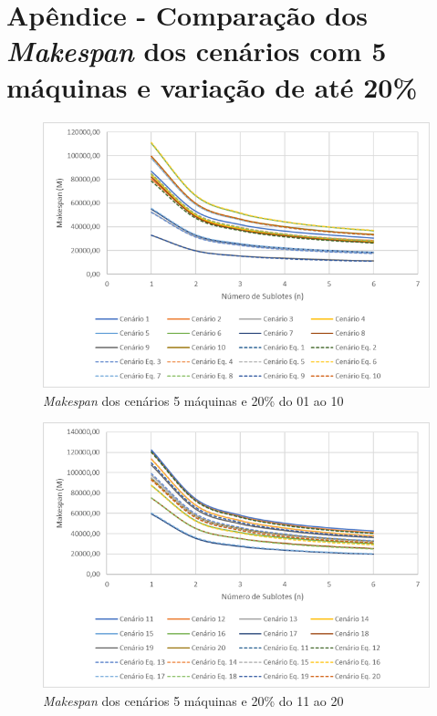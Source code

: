 \newpage
\section{Apêndice - Comparação dos \textit{Makespan} dos cenários com 5 máquinas e variação de até 20\%}\label{app:fig05machine20}

\begin{figure}[H]
    \centering
    \includegraphics[width=13cm]{Apendices/Figuras/05m20_01-10}
    \caption{\textit{Makespan} dos cenários 5 máquinas e 20\% do 01 ao 10}
    \label{fig:05m20_01-10}
\end{figure}

\begin{figure}[H]
    \centering
    \includegraphics[width=13cm]{Apendices/Figuras/05m20_11-20}
    \caption{\textit{Makespan} dos cenários 5 máquinas e 20\% do 11 ao 20}
    \label{fig:05m20_11-20}
\end{figure}

